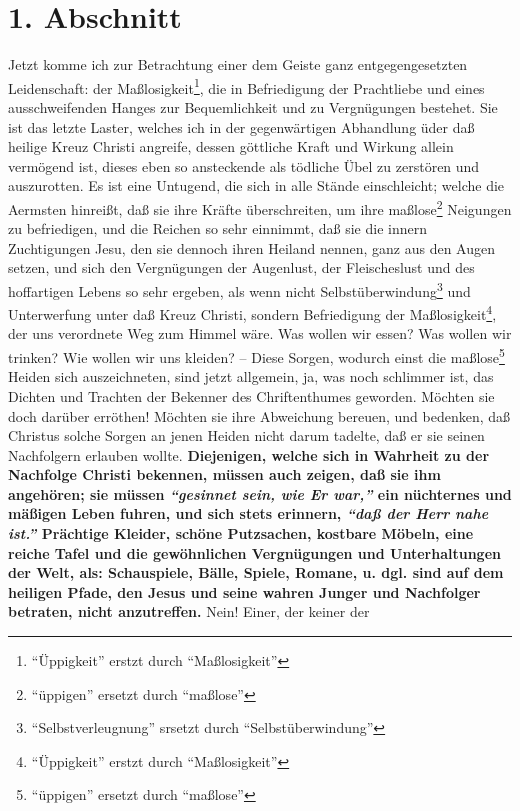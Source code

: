 \section{1. Abschnitt} \label{kap14_ab1}

Jetzt komme ich zur Betrachtung einer dem Geiste ganz entgegengesetzten
Leidenschaft: der Maßlosigkeit\footnote{"`Üppigkeit"' erstzt durch "`Maßlosigkeit"'}, die in Befriedigung der Prachtliebe und eines
ausschweifenden Hanges zur Bequemlichkeit und zu Vergnügungen bestehet. Sie ist
das letzte Laster, welches ich in der gegenwärtigen Abhandlung üder daß heilige
Kreuz Christi angreife, dessen göttliche Kraft und Wirkung allein vermögend ist,
dieses eben so ansteckende als tödliche Übel zu zerstören und auszurotten. Es
ist eine Untugend, die sich in alle Stände einschleicht; welche die Aermsten
hinreißt, daß sie ihre Kräfte überschreiten, um ihre maßlose\footnote{"`üppigen"' ersetzt durch "`maßlose"'} Neigungen zu
befriedigen, und die Reichen so sehr einnimmt, daß sie die innern Zuchtigungen
Jesu, den sie dennoch ihren Heiland nennen, ganz aus den Augen setzen, und sich
den Vergnügungen der Augenlust, der Fleischeslust und des hoffartigen Lebens so
sehr ergeben, als wenn nicht Selbstüberwindung\footnote{"`Selbstverleugnung"' srsetzt durch "`Selbstüberwindung"'} und Unterwerfung unter daß Kreuz
Christi, sondern Befriedigung der Maßlosigkeit\footnote{"`Üppigkeit"' erstzt durch "`Maßlosigkeit"'}, der uns verordnete Weg zum Himmel
wäre. Was wollen wir essen? Was wollen wir trinken? Wie wollen wir uns kleiden?
-- Diese Sorgen, wodurch einst die maßlose\footnote{"`üppigen"' ersetzt durch "`maßlose"'} Heiden sich auszeichneten, sind jetzt
allgemein, ja, was noch schlimmer ist, das Dichten und Trachten der Bekenner des
Chriftenthumes geworden. Möchten sie doch darüber erröthen! Möchten sie ihre
Abweichung bereuen, und bedenken, daß Christus solche Sorgen an jenen Heiden
nicht darum tadelte, daß er sie seinen Nachfolgern erlauben wollte. \textbf{Diejenigen,
welche sich in Wahrheit zu der Nachfolge Christi bekennen, müssen auch zeigen,
daß sie ihm angehören; sie müssen
\textit{"`gesinnet sein, wie Er war,"'} ein nüchternes
und mäßigen Leben fuhren, und sich stets erinnern,
\textit{"`daß der Herr nahe ist."'}
Prächtige Kleider, schöne Putzsachen, kostbare Möbeln, eine reiche Tafel und die
gewöhnlichen Vergnügungen und Unterhaltungen der Welt, als: Schauspiele, Bälle,
Spiele, Romane, u. dgl. sind auf dem heiligen Pfade, den Jesus und seine wahren
Junger und Nachfolger betraten, nicht anzutreffen.} Nein! Einer, der keiner der
